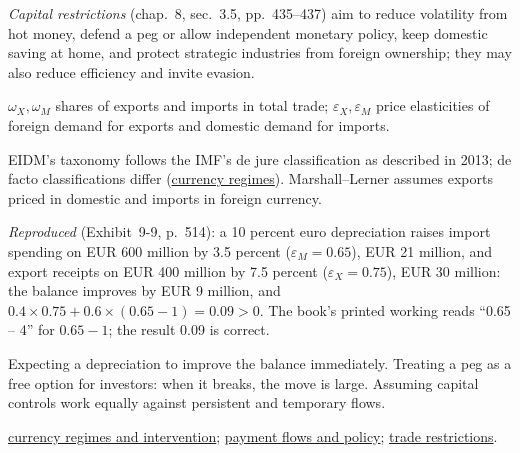 \begin{qfdefinition}
\emph{Capital restrictions} (chap.~8, sec.~3.5, pp.~435--437) aim to reduce volatility from hot money, defend a peg or allow independent monetary policy, keep domestic saving at home, and protect strategic industries from foreign ownership; they may also reduce efficiency and invite evasion.

 $\omega_X,\omega_M$ shares of exports and imports in total trade; $\varepsilon_X,\varepsilon_M$ price elasticities of foreign demand for exports and domestic demand for imports.

 EIDM's taxonomy follows the IMF's de jure classification as described in 2013; de facto classifications differ (\hyperref[def:currency-regimes-intervention]{currency regimes}). Marshall--Lerner assumes exports priced in domestic and imports in foreign currency.

 \emph{Reproduced} (Exhibit~9-9, p.~514): a 10 percent euro depreciation raises import spending on EUR 600 million by 3.5 percent ($\varepsilon_M=0.65$), EUR 21 million, and export receipts on EUR 400 million by 7.5 percent ($\varepsilon_X=0.75$), EUR 30 million: the balance improves by EUR 9 million, and $0.4\times0.75+0.6\times(0.65-1)=0.09>0$. The book's printed working reads ``0.65 -- 4'' for $0.65-1$; the result 0.09 is correct.

 Expecting a depreciation to improve the balance immediately. Treating a peg as a free option for investors: when it breaks, the move is large. Assuming capital controls work equally against persistent and temporary flows.

 \hyperref[def:currency-regimes-intervention]{currency regimes and intervention}; \hyperref[def:flows-policy-exchange-rates]{payment flows and policy}; \hyperref[meth:trade-benefits-restrictions-blocs]{trade restrictions}.

\end{qfdefinition}

